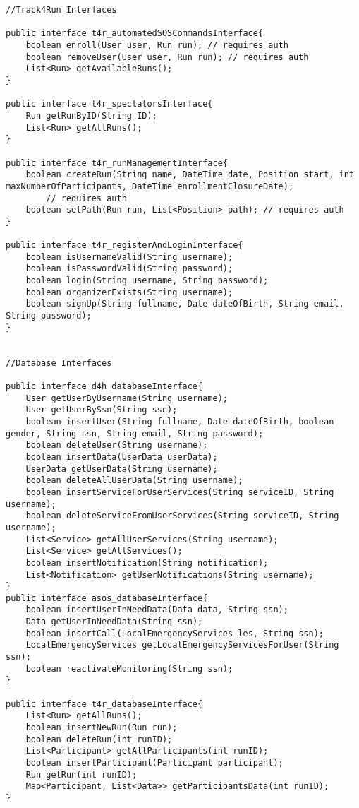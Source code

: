 \documentclass[../../DD.tex]{subfiles}
\begin{document}
\begin{lstlisting}
//Track4Run Interfaces

public interface t4r_automatedSOSCommandsInterface{
	boolean enroll(User user, Run run); // requires auth
	boolean removeUser(User user, Run run); // requires auth
	List<Run> getAvailableRuns();
}

public interface t4r_spectatorsInterface{
	Run getRunByID(String ID);
	List<Run> getAllRuns();
}

public interface t4r_runManagementInterface{
	boolean createRun(String name, DateTime date, Position start, int maxNumberOfParticipants, DateTime enrollmentClosureDate);
		// requires auth
	boolean setPath(Run run, List<Position> path); // requires auth
}

public interface t4r_registerAndLoginInterface{
	boolean isUsernameValid(String username);
	boolean isPasswordValid(String password);
	boolean login(String username, String password);
	boolean organizerExists(String username);
	boolean signUp(String fullname, Date dateOfBirth, String email, String password);
}


//Database Interfaces

public interface d4h_databaseInterface{
	User getUserByUsername(String username);
	User getUserBySsn(String ssn);
	boolean insertUser(String fullname, Date dateOfBirth, boolean gender, String ssn, String email, String password);
	boolean deleteUser(String username);
	boolean insertData(UserData userData);
	UserData getUserData(String username);
	boolean deleteAllUserData(String username);
	boolean insertServiceForUserServices(String serviceID, String username);
	boolean deleteServiceFromUserServices(String serviceID, String username);
	List<Service> getAllUserServices(String username);
	List<Service> getAllServices();
	boolean insertNotification(String notification);
	List<Notification> getUserNotifications(String username);
}
public interface asos_databaseInterface{
	boolean insertUserInNeedData(Data data, String ssn);
	Data getUserInNeedData(String ssn);
	boolean insertCall(LocalEmergencyServices les, String ssn);
	LocalEmergencyServices getLocalEmergencyServicesForUser(String ssn);
	boolean reactivateMonitoring(String ssn);
}

public interface t4r_databaseInterface{
	List<Run> getAllRuns();
	boolean insertNewRun(Run run);
	boolean deleteRun(int runID);
	List<Participant> getAllParticipants(int runID);
	boolean insertParticipant(Participant participant);
	Run getRun(int runID);
	Map<Participant, List<Data>> getParticipantsData(int runID);
}

\end{lstlisting}
\newpage
\end{document}
